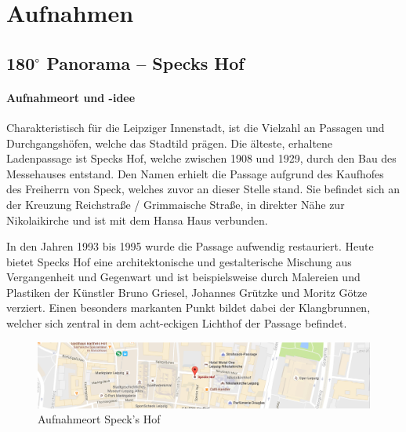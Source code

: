 \documentclass[liststotoc,bibtotoc,fontsize=14pt,]{scrreprt}
\begin{document}
	\chapter{Aufnahmen}
	\label{ch:aufnahmen}
	
	\section{180$^\circ$ Panorama -- Speck\grq s Hof}
	\label{sec:specks}

	\subsubsection{Aufnahmeort und -idee}
	Charakteristisch für die Leipziger Innenstadt, ist die Vielzahl an Passagen und Durchgangshöfen, welche das Stadtild prägen. Die älteste, erhaltene Ladenpassage ist Speck\grq s Hof, welche zwischen 1908 und 1929, durch den Bau des Messehauses entstand. Den Namen erhielt die Passage aufgrund des Kaufhofes des Freiherrn von Speck, welches zuvor an dieser Stelle stand. Sie befindet sich an der Kreuzung Reichstraße / Grimmaische Straße, in direkter Nähe zur Nikolaikirche und ist mit dem Hansa Haus verbunden. 
	
	\bigskip
	In den Jahren 1993 bis 1995 wurde die Passage aufwendig restauriert. Heute bietet Speck\grq s Hof eine architektonische und gestalterische Mischung aus Vergangenheit und Gegenwart und ist beispielsweise durch Malereien und Plastiken der Künstler Bruno Griesel, Johannes Grützke und Moritz Götze verziert. Einen besonders markanten Punkt bildet dabei der Klangbrunnen, welcher sich zentral in dem acht-eckigen Lichthof der Passage befindet.
	
			\begin{figure}[H]
				\includegraphics[width=\linewidth]{img/places/sh_map.jpg}
				\caption{Aufnahmeort Speck's Hof}
				\label{img:sh_map}
			\end{figure}
			
	
\end{document}
